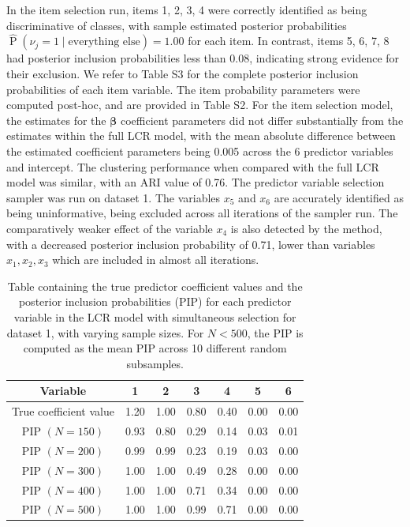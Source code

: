 \documentclass[11pt]{article}
\def\prob{\operatorname{P}}
\def\bsbet{\boldsymbol{\beta}}
\theoremstyle{plain}
\theoremstyle{definition}
\begin{document}
In the item selection run, items 1, 2, 3, 4 were correctly identified as being discriminative of classes, with sample estimated posterior probabilities $\widehat{\prob}(\nu_j = 1 \mid \text{everything else}) = 1.00$ for each item. In contrast, items 5, 6, 7, 8 had posterior inclusion probabilities less than 0.08, indicating strong evidence for their exclusion. We refer to Table S3 for the complete posterior inclusion probabilities of each item variable. The item probability parameters were computed post-hoc, and are provided in Table S2. For the item selection model, the estimates for the $\bsbet$ coefficient parameters did not differ substantially from the estimates within the full LCR model, with the mean absolute difference between the estimated coefficient parameters being 0.005 across the 6 predictor variables and intercept. The clustering performance when compared with the full LCR model was similar, with an ARI value of 0.76.
The predictor variable selection sampler was run on dataset 1. The variables $x_5$ and $x_6$ are accurately identified as being uninformative, being excluded across all iterations of the sampler run. The comparatively weaker effect of the variable $x_4$ is also detected by the method, with a decreased posterior inclusion probability of 0.71, lower than variables $x_1, x_2, x_3$ which are included in almost all iterations. 
\begin{table}
\centering
\begin{tabular}{ccccccc}
\hline
Variable & 1 & 2 & 3 & 4 & 5 & 6    \\
\hline
True coefficient value & 1.20 & 1.00 & 0.80 & 0.40 & 0.00 & 0.00\\
PIP $(N = 150)$ & 0.93 & 0.80 & 0.29 & 0.14 & 0.03 & 0.01  \\
PIP $(N = 200)$ & 0.99 & 0.99 & 0.23 & 0.19 & 0.03 & 0.00  \\
PIP $(N = 300)$ & 1.00 & 1.00 & 0.49 & 0.28 & 0.00 & 0.00  \\
PIP $(N = 400)$ & 1.00 & 1.00 & 0.71 & 0.34 & 0.00 & 0.00  \\
PIP $(N = 500)$ & 1.00 & 1.00 & 0.99 & 0.71 & 0.00 & 0.00  \\

\hline
\end{tabular}
\caption{Table containing the true predictor coefficient values and the posterior inclusion probabilities (PIP) for each predictor variable in the LCR model with simultaneous selection for dataset 1, with varying sample sizes. For $N<500$, the PIP is computed as the mean PIP across 10 different random subsamples.}\label{table:predictor_selection_results_sim_study1}
\end{table}
\end{document}
